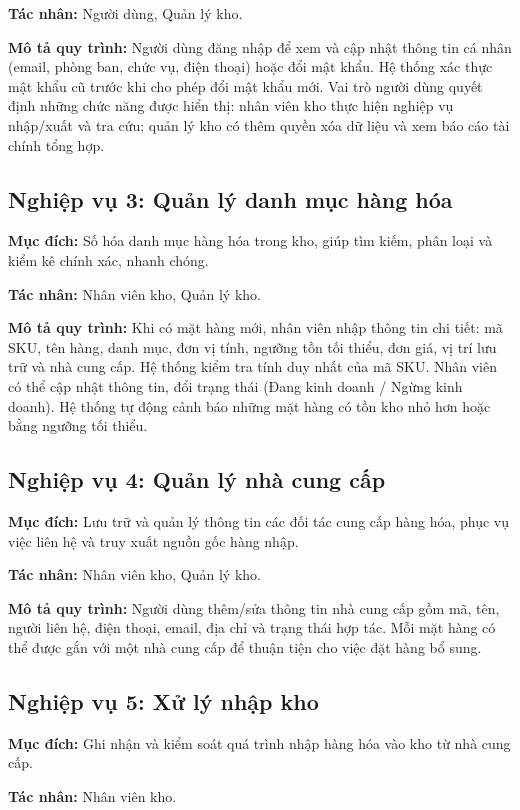 \documentclass[12pt,a4paper]{report}
\begin{document}
\noindent\textbf{Tác nhân:} Người dùng, Quản lý kho.

\noindent\textbf{Mô tả quy trình:} Người dùng đăng nhập để xem và cập nhật thông
tin cá nhân (email, phòng ban, chức vụ, điện thoại) hoặc đổi mật khẩu. Hệ thống
xác thực mật khẩu cũ trước khi cho phép đổi mật khẩu mới. Vai trò người dùng
quyết định những chức năng được hiển thị: nhân viên kho thực hiện nghiệp vụ
nhập/xuất và tra cứu; quản lý kho có thêm quyền xóa dữ liệu và xem báo cáo tài
chính tổng hợp.

\subsection{Nghiệp vụ 3: Quản lý danh mục hàng hóa}
\textbf{Mục đích:} Số hóa danh mục hàng hóa trong kho, giúp tìm kiếm, phân loại
và kiểm kê chính xác, nhanh chóng.

\noindent\textbf{Tác nhân:} Nhân viên kho, Quản lý kho.

\noindent\textbf{Mô tả quy trình:} Khi có mặt hàng mới, nhân viên nhập thông tin
chi tiết: mã SKU, tên hàng, danh mục, đơn vị tính, ngưỡng tồn tối thiểu, đơn
giá, vị trí lưu trữ và nhà cung cấp. Hệ thống kiểm tra tính duy nhất của mã SKU.
Nhân viên có thể cập nhật thông tin, đổi trạng thái (Đang kinh doanh / Ngừng
kinh doanh). Hệ thống tự động cảnh báo những mặt hàng có tồn kho nhỏ hơn hoặc
bằng ngưỡng tối thiểu.

\subsection{Nghiệp vụ 4: Quản lý nhà cung cấp}
\textbf{Mục đích:} Lưu trữ và quản lý thông tin các đối tác cung cấp hàng hóa,
phục vụ việc liên hệ và truy xuất nguồn gốc hàng nhập.

\noindent\textbf{Tác nhân:} Nhân viên kho, Quản lý kho.

\noindent\textbf{Mô tả quy trình:} Người dùng thêm/sửa thông tin nhà cung cấp
gồm mã, tên, người liên hệ, điện thoại, email, địa chỉ và trạng thái hợp tác.
Mỗi mặt hàng có thể được gắn với một nhà cung cấp để thuận tiện cho việc đặt
hàng bổ sung.

\subsection{Nghiệp vụ 5: Xử lý nhập kho}
\textbf{Mục đích:} Ghi nhận và kiểm soát quá trình nhập hàng hóa vào kho từ nhà
cung cấp.

\noindent\textbf{Tác nhân:} Nhân viên kho.
\end{document}
